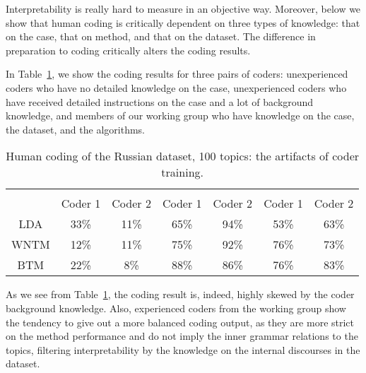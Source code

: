 Interpretability is really hard to measure in an objective way. Moreover, below we show that human coding is critically dependent on three types of knowledge: that on the case, that on method, and that on the dataset. The difference in preparation to coding critically alters the coding results.

In Table~\cref{tab:coderTrainingArtifacts}, we show the coding results for three pairs of coders: unexperienced coders who have no detailed knowledge on the case, unexperienced coders who have received detailed instructions on the case and a lot of background knowledge, and members of our working group who have knowledge on the case, the dataset, and the algorithms.

\begin{table}[ht]%
	\centering
	\caption{Human coding of the Russian dataset, 100 topics: the artifacts of coder training.}%
	\label{tab:coderTrainingArtifacts}%
		\begin{tabular}{ c  c  c  c  c  c  c }%
			\toprule
			 & \multicolumn{2}{c}{\makecell{Unexperienced}} & \multicolumn{2}{c}{\makecell{Trained}} & \multicolumn{2}{c}{\makecell{Experienced}}\\
			\cline{2-7}
			& Coder 1 & Coder 2 & Coder 1 & Coder 2 & Coder 1 & Coder 2\\
			\hline
			LDA & 33\% & 11\% & 65\% & 94\% & 53\% & 63\% \\
			WNTM & 12\% & 11\% & 75\% & 92\% & 76\% & 73\%\\
			BTM & 22\% & 8\% & 88\% & 86\% & 76\% & 83\%\\
			\bottomrule
		\end{tabular}%
\end{table}

As we see from Table~\cref{tab:coderTrainingArtifacts}, the coding result is, indeed, highly skewed by the coder background knowledge. Also, experienced coders from the working group show the tendency to give out a more balanced coding output, as they are more strict on the method performance and do not imply the inner grammar relations to the topics, filtering interpretability by the knowledge on the internal discourses in the dataset.

